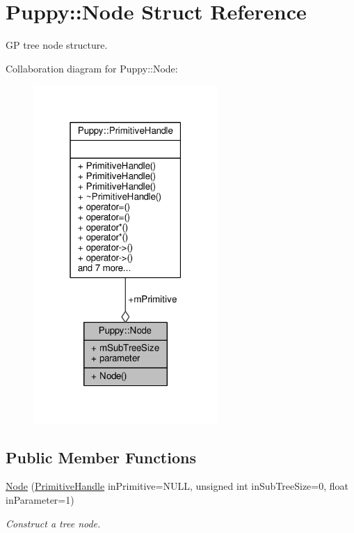 \hypertarget{structPuppy_1_1Node}{}\section{Puppy\+:\+:Node Struct Reference}
\label{structPuppy_1_1Node}


G\+P tree node structure.  




Collaboration diagram for Puppy\+:\+:Node\+:
\nopagebreak
\begin{figure}[H]
\begin{center}
\leavevmode
\includegraphics[width=199pt]{structPuppy_1_1Node__coll__graph}
\end{center}
\end{figure}
\subsection*{Public Member Functions}
\begin{DoxyCompactItemize}
\item 
\hyperlink{structPuppy_1_1Node_a766ad2009752aa91f8c5a66753c9d1d7}{Node} (\hyperlink{classPuppy_1_1PrimitiveHandle}{Primitive\+Handle} in\+Primitive=N\+U\+L\+L, unsigned int in\+Sub\+Tree\+Size=0, float in\+Parameter=1)
\begin{DoxyCompactList}\small\item\em Construct a tree node. \end{DoxyCompactList}\end{DoxyCompactItemize}
